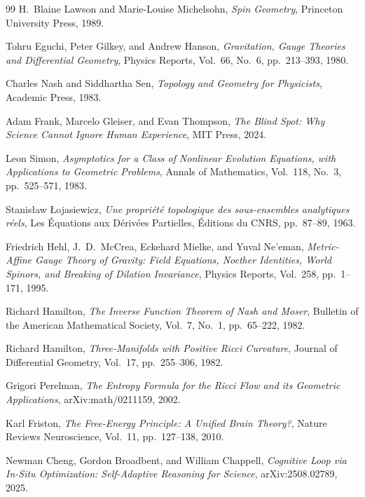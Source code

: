 \documentclass[12pt,a4paper]{article}
\begin{document}
\begin{thebibliography}{99}
H.~Blaine Lawson and Marie-Louise Michelsohn,
\textit{Spin Geometry},
Princeton University Press, 1989.

Tohru Eguchi, Peter Gilkey, and Andrew Hanson,
\textit{Gravitation, Gauge Theories and Differential Geometry},
Physics Reports, Vol.~66, No.~6, pp.~213--393, 1980.

Charles Nash and Siddhartha Sen,
\textit{Topology and Geometry for Physicists},
Academic Press, 1983.

Adam Frank, Marcelo Gleiser, and Evan Thompson,
\textit{The Blind Spot: Why Science Cannot Ignore Human Experience},
MIT Press, 2024.

Leon Simon,
\textit{Asymptotics for a Class of Nonlinear Evolution Equations, with Applications to Geometric Problems},
Annals of Mathematics, Vol.~118, No.~3, pp.~525--571, 1983.

Stanis\l{}aw Ło\-ja\-sie\-wicz,
\textit{Une propri\'{e}t\'{e} topologique des sous-ensembles analytiques r\'{e}els},
Les \'{E}quations aux D\'{e}riv\'{e}es Partielles,
\'{E}ditions du CNRS, pp.~87--89, 1963.


Friedrich Hehl, J.~D.~McCrea, Eckehard Mielke, and Yuval Ne'eman,
\textit{Metric-Affine Gauge Theory of Gravity: Field Equations, Noether Identities, World Spinors, and Breaking of Dilation Invariance},
Physics Reports, Vol.~258, pp.~1--171, 1995.

Richard Hamilton,
\textit{The Inverse Function Theorem of Nash and Moser},
Bulletin of the American Mathematical Society, Vol.~7, No.~1, pp.~65--222, 1982.

Richard Hamilton,
\textit{Three-Manifolds with Positive Ricci Curvature},
Journal of Differential Geometry, Vol.~17, pp.~255--306, 1982.

Grigori Perelman,
\textit{The Entropy Formula for the Ricci Flow and its Geometric Applications},
arXiv:math/0211159, 2002.

Karl Friston,
\textit{The Free-Energy Principle: A Unified Brain Theory?},
Nature Reviews Neuroscience, Vol.~11, pp.~127--138, 2010.

Newman Cheng, Gordon Broadbent, and William Chappell,
\textit{Cognitive Loop via In-Situ Optimization: Self-Adaptive Reasoning for Science},
arXiv:2508.02789, 2025.


\end{thebibliography}
\end{document}
